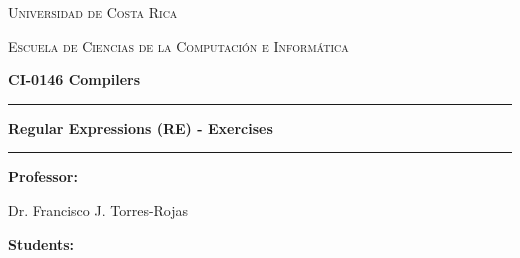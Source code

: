 \documentclass[12pt]{article}
\begin{document}

\begin{titlepage}

    \centering

    \vspace*{1.5cm}

    {\Large\textsc{Universidad de Costa Rica}\par}

    \vspace{0.7cm}

    {\large\textsc{Escuela de Ciencias de la Computación e Informática}\par}

    \vspace{0.8cm}

    {\large\textbf{CI-0146 Compilers}\par}


    \vspace{2.5cm}
    \rule{0.99\textwidth}{0.6pt}
    \vspace{0.1cm}
    {\LARGE\textbf{Regular Expressions (RE) - Exercises}\par}
    \vspace{0.1cm}
    \rule{0.99\textwidth}{0.6pt}


    \vspace{2.2cm}

    \noindent
    \begin{minipage}[t]{0.45\textwidth}
        \raggedright

        \textbf{Professor:}

        \vspace{0.25cm}

        Dr. Francisco J. Torres-Rojas

    \end{minipage}
    \hfill
    \begin{minipage}[t]{0.45\textwidth}
        \raggedleft

        \textbf{Students:}

        \vspace{0.25cm}


\end{minipage}
\end{titlepage}
\end{document}
